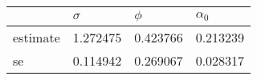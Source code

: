 \begin{tabular}{llll}
\toprule
{} &  $\sigma$ &    $\phi$ & $\alpha_0$ \\
\midrule
estimate &  1.272475 &  0.423766 &   0.213239 \\
se       &  0.114942 &  0.269067 &   0.028317 \\
\bottomrule
\end{tabular}
